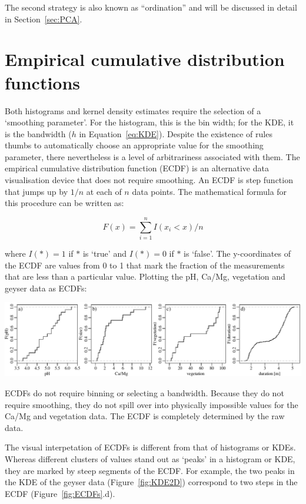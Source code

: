 The second strategy is also known as ``ordination'' and will be
discussed in detail in Section~\ref{sec:PCA}.

\section{Empirical cumulative distribution functions}
\label{sec:ECDF}

Both histograms and kernel density estimates require the selection of
a `smoothing parameter'. For the histogram, this is the bin width; for
the KDE, it is the bandwidth ($h$ in Equation~\ref{eq:KDE}). Despite
the existence of rules thumbs to automatically choose an appropriate
value for the smoothing parameter, there nevertheless is a level of
arbitrariness associated with them. The empirical cumulative
distribution function (ECDF) is an alternative data visualisation
device that does not require smoothing. An ECDF is step function that
jumps up by $1/n$ at each of $n$ data points.  The mathematical
formula for this procedure can be written as:
  
  \begin{equation}
    F(x) = \sum\limits_{i=1}^{n} I(x_i<x)/n
    \label{eq:ECDF}
  \end{equation}
 
\noindent where $I(\ast) = 1$ if $\ast$ is `true' and $I(\ast) = 0$ if
$\ast$ is `false'. The y-coordinates of the ECDF are values from 0 to
1 that mark the fraction of the measurements that are less than a
particular value.  Plotting the pH, Ca/Mg, vegetation and geyser data
as ECDFs:

\noindent\includegraphics[width=\textwidth]{../figures/ECDFs.pdf}
\begingroup {}
\label{fig:ECDFs}
\endgroup

ECDFs do not require binning or selecting a bandwidth.  Because they
do not require smoothing, they do not spill over into physically
impossible values for the Ca/Mg and vegetation data. The ECDF is
completely determined by the raw data.\medskip

The visual interpetation of ECDFs is different from that of histograms
or KDEs. Whereas different clusters of values stand out as `peaks' in
a histogram or KDE, they are marked by steep segments of the ECDF. For
example, the two peaks in the KDE of the geyser data
(Figure~\ref{fig:KDE2D}) correspond to two steps in the ECDF
(Figure~\ref{fig:ECDFs}.d).
